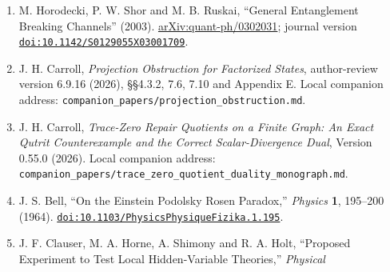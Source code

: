 \documentclass[
  11pt,
]{article}
\begin{document}
\begin{enumerate}
\item
  M. Horodecki, P. W. Shor and M. B. Ruskai, ``General Entanglement
  Breaking Channels'' (2003).
  \href{https://arxiv.org/abs/quant-ph/0302031}{arXiv:quant-ph\allowbreak{}/\allowbreak{}0302031};
  journal version
  \href{https://doi.org/10.1142/S0129055X03001709}{\nolinkurl{doi:10.1142/S0129055X03001709}}.
\item
  J. H. Carroll, \emph{Projection Obstruction for Factorized States},
  author-review version 6.9.16 (2026), §§4.3.2, 7.6, 7.10 and Appendix
  E. Local companion address:
  \texttt{c\allowbreak{}o\allowbreak{}m\allowbreak{}p\allowbreak{}a\allowbreak{}n\allowbreak{}i\allowbreak{}o\allowbreak{}n\allowbreak{}\_\allowbreak{}p\allowbreak{}a\allowbreak{}p\allowbreak{}e\allowbreak{}r\allowbreak{}s\allowbreak{}/\allowbreak{}p\allowbreak{}r\allowbreak{}o\allowbreak{}j\allowbreak{}e\allowbreak{}c\allowbreak{}t\allowbreak{}i\allowbreak{}o\allowbreak{}n\allowbreak{}\_\allowbreak{}o\allowbreak{}b\allowbreak{}s\allowbreak{}t\allowbreak{}r\allowbreak{}u\allowbreak{}c\allowbreak{}t\allowbreak{}i\allowbreak{}o\allowbreak{}n\allowbreak{}.\allowbreak{}m\allowbreak{}d}.
\item
  J. H. Carroll, \emph{Trace-Zero Repair Quotients on a Finite Graph: An
  Exact Qutrit Counterexample and the Correct Scalar-Divergence Dual},
  Version 0.55.0 (2026). Local companion address:
  \texttt{c\allowbreak{}o\allowbreak{}m\allowbreak{}p\allowbreak{}a\allowbreak{}n\allowbreak{}i\allowbreak{}o\allowbreak{}n\allowbreak{}\_\allowbreak{}p\allowbreak{}a\allowbreak{}p\allowbreak{}e\allowbreak{}r\allowbreak{}s\allowbreak{}/\allowbreak{}t\allowbreak{}r\allowbreak{}a\allowbreak{}c\allowbreak{}e\allowbreak{}\_\allowbreak{}z\allowbreak{}e\allowbreak{}r\allowbreak{}o\allowbreak{}\_\allowbreak{}q\allowbreak{}u\allowbreak{}o\allowbreak{}t\allowbreak{}i\allowbreak{}e\allowbreak{}n\allowbreak{}t\allowbreak{}\_\allowbreak{}d\allowbreak{}u\allowbreak{}a\allowbreak{}l\allowbreak{}i\allowbreak{}t\allowbreak{}y\allowbreak{}\_\allowbreak{}m\allowbreak{}o\allowbreak{}n\allowbreak{}o\allowbreak{}g\allowbreak{}r\allowbreak{}a\allowbreak{}p\allowbreak{}h\allowbreak{}.\allowbreak{}m\allowbreak{}d}.
\item
  J. S. Bell, ``On the Einstein Podolsky Rosen Paradox,'' \emph{Physics}
  \textbf{1}, 195--200 (1964).
  \href{https://doi.org/10.1103/PhysicsPhysiqueFizika.1.195}{\nolinkurl{doi:10.1103/PhysicsPhysiqueFizika.1.195}}.
\item
  J. F. Clauser, M. A. Horne, A. Shimony and R. A. Holt, ``Proposed
  Experiment to Test Local Hidden-Variable Theories,'' \emph{Physical
}
\end{enumerate}
\end{document}
